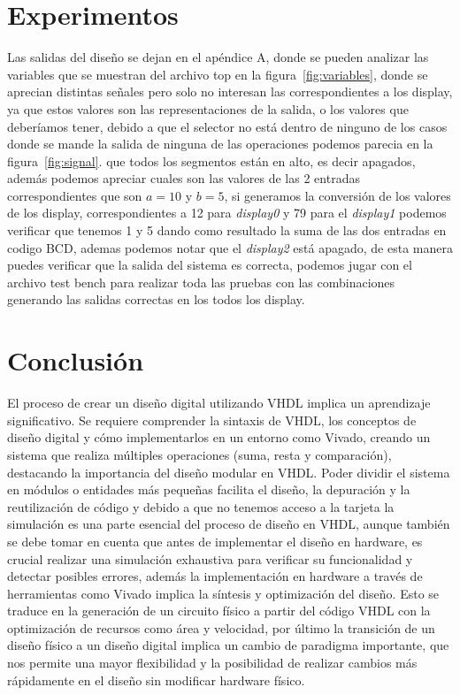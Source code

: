 \documentclass[a4paper, 12pt]{article}
\begin{document}
    \section{Experimentos}
    Las salidas del diseño se dejan en el apéndice A, donde se pueden analizar las variables que se muestran del archivo top en la figura~\ref{fig:variables}, donde se aprecian distintas señales pero solo no interesan las correspondientes a los display, ya que estos valores son las representaciones de la salida, o los valores que deberíamos tener, debido a que el selector no está dentro de ninguno de los casos donde se mande la salida de ninguna de las operaciones podemos parecia en la figura~\ref{fig:signal}. que todos los segmentos están en alto, es decir apagados, además podemos apreciar cuales son las valores de las 2 entradas correspondientes que son $a = 10$ y $b = 5$, si generamos la conversión de los valores de los display, correspondientes a 12 para \emph{display0} y 79 para el \emph{display1} podemos verificar que tenemos 1 y 5 dando como resultado la suma de las dos entradas en codigo BCD, ademas podemos notar que el \emph{display2} está apagado, de esta manera puedes verificar que la salida del sistema es correcta, podemos jugar con el archivo test bench para realizar toda las pruebas con las combinaciones generando las salidas correctas en los todos los display.

    \section{Conclusión}
    El proceso de crear un diseño digital utilizando VHDL implica un aprendizaje significativo. Se requiere comprender la sintaxis de VHDL, los conceptos de diseño digital y cómo implementarlos en un entorno como Vivado, creando un sistema que realiza múltiples operaciones (suma, resta y comparación), destacando la importancia del diseño modular en VHDL. 
    Poder dividir el sistema en módulos o entidades más pequeñas facilita el diseño, la depuración y la reutilización de código y debido a que no tenemos acceso a la tarjeta la simulación es una parte esencial del proceso de diseño en VHDL, aunque también se debe tomar en cuenta que antes de implementar el diseño en hardware, es crucial realizar una simulación exhaustiva para verificar su funcionalidad y detectar posibles errores, además la implementación en hardware a través de herramientas como Vivado implica la síntesis y optimización del diseño. Esto se traduce en la generación de un circuito físico a partir del código VHDL con la optimización de recursos como área y velocidad, por último la transición de un diseño físico a un diseño digital implica un cambio de paradigma importante, que nos permite una mayor flexibilidad y la posibilidad de realizar cambios más rápidamente en el diseño sin modificar hardware físico.    
\end{document}
